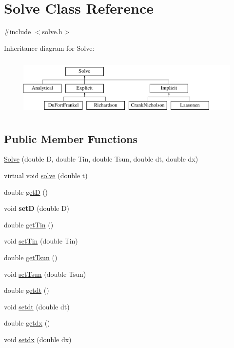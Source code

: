 \hypertarget{class_solve}{}\section{Solve Class Reference}
\label{class_solve}


{\ttfamily \#include $<$solve.\+h$>$}

Inheritance diagram for Solve\+:\begin{figure}[H]
\begin{center}
\leavevmode
\includegraphics[height=3.000000cm]{class_solve}
\end{center}
\end{figure}
\subsection*{Public Member Functions}
\begin{DoxyCompactItemize}
\item 
\hyperlink{class_solve_a1e0efad6dcf6b09759dd38df7aa08db8}{Solve} (double D, double Tin, double Tsun, double dt, double dx)
\item 
virtual void \hyperlink{class_solve_a1a56722993fdabea9928637d7dd8a2c7}{solve} (double t)
\item 
double \hyperlink{class_solve_a0edcf69bae8414576fbb1b35ba395a1c}{getD} ()
\item 
\mbox{\label{class_solve_ab313553673e1e419bcc150be13d3d58b}} 
void {\bfseries setD} (double D)
\item 
double \hyperlink{class_solve_a7d9d481ed1bf8bbfc5bf37517e2a12c6}{get\+Tin} ()
\item 
void \hyperlink{class_solve_acef277ebf827a664b4378285a1fbeca3}{set\+Tin} (double Tin)
\item 
double \hyperlink{class_solve_afad3694fc830b80135a316eea2c0c279}{get\+Tsun} ()
\item 
void \hyperlink{class_solve_a2088840c7117930845bc61444cbba285}{set\+Tsun} (double Tsun)
\item 
double \hyperlink{class_solve_a981e11c3c390bc54041a8e60ebdcc4bf}{getdt} ()
\item 
void \hyperlink{class_solve_af05556226469b3b7d4773b61342fbf73}{setdt} (double dt)
\item 
double \hyperlink{class_solve_aad066a37070623f3c1bfb5f001fd2a50}{getdx} ()
\item 
void \hyperlink{class_solve_a60a27ba683584477189dc9c260c75127}{setdx} (double dx)
\end{DoxyCompactItemize}
